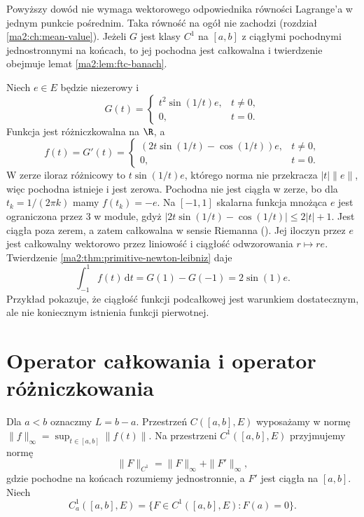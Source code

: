 Powyższy dowód nie wymaga wektorowego
odpowiednika równości Lagrange'a w jednym
punkcie pośrednim. Taka równość na ogół
nie zachodzi (rozdział \ref{ma2:ch:mean-value}).
Jeżeli $G$ jest klasy $C^1$ na $[a,b]$
z ciągłymi pochodnymi jednostronnymi na
końcach, to jej pochodna jest całkowalna
i twierdzenie obejmuje lemat
\ref{ma2:lem:ftc-banach}.

\begin{przyklad}
\label{ma2:ex:primitive-discontinuous-derivative}
Niech $e\in E$ będzie niezerowy i
\[
 G(t)=
 \begin{cases}
 t^2\sin(1/t)e,&t\ne0,\\
 0,&t=0.
 \end{cases}
\]
Funkcja jest różniczkowalna na $\R$, a
\[
 f(t)=G'(t)=
 \begin{cases}
 (2t\sin(1/t)-\cos(1/t))e,&t\ne0,\\
 0,&t=0.
 \end{cases}
\]
W zerze iloraz różnicowy to
$t\sin(1/t)e$, którego norma nie przekracza
$|t|\|e\|$, więc pochodna istnieje i jest zerowa.
Pochodna nie jest ciągła w zerze, bo dla
$t_k=1/(2\pi k)$ mamy $f(t_k)=-e$.
Na $[-1,1]$ skalarna funkcja mnożąca $e$
jest ograniczona przez $3$ w module,
gdyż $|2t\sin(1/t)-\cos(1/t)|\le2|t|+1$.
Jest ciągła poza zerem, a zatem całkowalna
w sensie Riemanna
().
Jej iloczyn przez $e$ jest całkowalny
wektorowo przez liniowość i ciągłość
odwzorowania $r\mapsto re$.
Twierdzenie \ref{ma2:thm:primitive-newton-leibniz}
daje
\[
 \int_{-1}^1 f(t)\,\mathrm dt
 =G(1)-G(-1)=2\sin(1)e.
\]
Przykład pokazuje, że ciągłość funkcji
podcałkowej jest warunkiem dostatecznym,
ale nie koniecznym istnienia funkcji pierwotnej.
\end{przyklad}

\section{Operator całkowania i operator różniczkowania}

Dla $a<b$ oznaczmy $L=b-a$.
Przestrzeń $C([a,b],E)$ wyposażamy w normę
$\|f\|_\infty=\sup_{t\in[a,b]}\|f(t)\|$.
Na przestrzeni $C^1([a,b],E)$ przyjmujemy
normę
\[
 \|F\|_{C^1}=\|F\|_\infty+\|F'\|_\infty,
\]
gdzie pochodne na końcach rozumiemy
jednostronnie, a $F'$ jest ciągła na $[a,b]$.
Niech
\[
 C^1_a([a,b],E)=\{F\in C^1([a,b],E):F(a)=0\}.
\]

